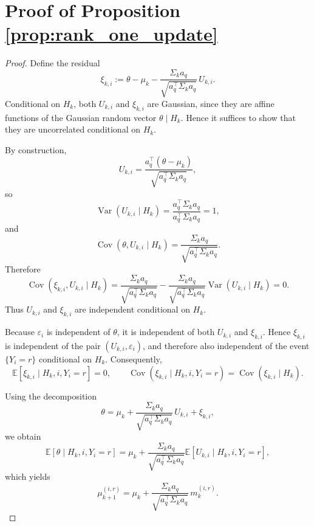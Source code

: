 \documentclass{article}
\begin{document}
\section{Proof of Proposition \ref{prop:rank_one_update}}
\begin{proof}
Define the residual
\begin{equation*}
\xi_{k,i}
:=
\theta-\mu_k-\frac{\Sigma_k a_q}{\sqrt{a_q^\top\Sigma_k a_q}}\,U_{k,i}.
\end{equation*}
Conditional on $H_k$, both $U_{k,i}$ and $\xi_{k,i}$ are Gaussian, since they are affine
functions of the Gaussian random vector $\theta\mid H_k$. Hence it suffices to show that they
are uncorrelated conditional on $H_k$.

By construction,
\begin{equation*}
U_{k,i}
=
\frac{a_q^\top(\theta-\mu_k)}{\sqrt{a_q^\top\Sigma_k a_q}},
\end{equation*}
so
\begin{equation*}
\operatorname{Var}(U_{k,i}\mid H_k)
=
\frac{a_q^\top\Sigma_k a_q}{a_q^\top\Sigma_k a_q}
=1,
\end{equation*}
and
\begin{equation*}
\operatorname{Cov}(\theta,U_{k,i}\mid H_k)
=
\frac{\Sigma_k a_q}{\sqrt{a_q^\top\Sigma_k a_q}}.
\end{equation*}
Therefore
\begin{equation*}
\operatorname{Cov}(\xi_{k,i},U_{k,i}\mid H_k)
=
\frac{\Sigma_k a_q}{\sqrt{a_q^\top\Sigma_k a_q}}
-
\frac{\Sigma_k a_q}{\sqrt{a_q^\top\Sigma_k a_q}}
\operatorname{Var}(U_{k,i}\mid H_k)
=0.
\end{equation*}
Thus $U_{k,i}$ and $\xi_{k,i}$ are independent conditional on $H_k$.

Because $\varepsilon_i$ is independent of $\theta$, it is independent of both $U_{k,i}$ and
$\xi_{k,i}$. Hence $\xi_{k,i}$ is independent of the pair $(U_{k,i},\varepsilon_i)$, and therefore
also independent of the event $\{Y_i=r\}$ conditional on $H_k$. Consequently,
\begin{equation*}
\mathbb E[\xi_{k,i}\mid H_k,i,Y_i=r]=0,
\qquad
\operatorname{Cov}(\xi_{k,i}\mid H_k,i,Y_i=r)=\operatorname{Cov}(\xi_{k,i}\mid H_k).
\end{equation*}

Using the decomposition
\begin{equation*}
\theta
=
\mu_k
+
\frac{\Sigma_k a_q}{\sqrt{a_q^\top\Sigma_k a_q}}\,U_{k,i}
+
\xi_{k,i},
\end{equation*}
we obtain
\begin{equation*}
\mathbb E[\theta\mid H_k,i,Y_i=r]
=
\mu_k+
\frac{\Sigma_k a_q}{\sqrt{a_q^\top\Sigma_k a_q}}
\mathbb E[U_{k,i}\mid H_k,i,Y_i=r],
\end{equation*}
which yields
\begin{equation*}
\mu_{k+1}^{(i,r)}
=
\mu_k+
\frac{\Sigma_k a_q}{\sqrt{a_q^\top\Sigma_k a_q}}\,m_{k}^{(i,r)}.
\end{equation*}


\end{proof}
\end{document}
